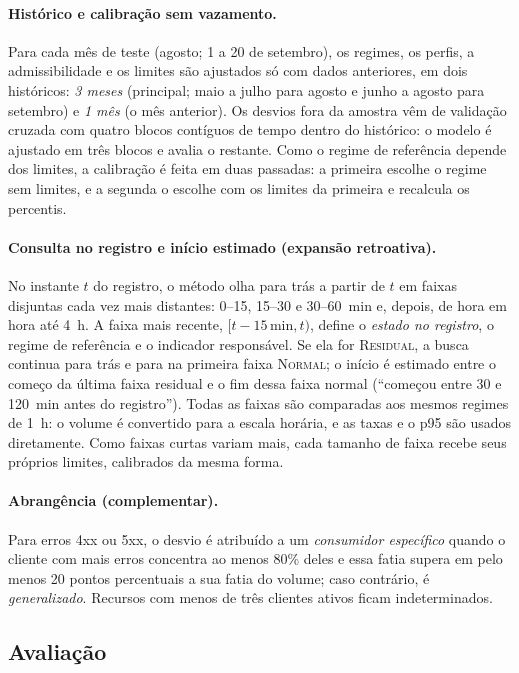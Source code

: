 \documentclass[sigconf,nonacm]{acmart}
\newcommand{\Normal}{\textsc{Normal}\xspace}
\newcommand{\Residual}{\textsc{Residual}\xspace}
\begin{document}
\paragraph{Histórico e calibração sem vazamento.} Para cada mês de teste (agosto; 1 a 20 de setembro), os regimes, os perfis, a admissibilidade e os limites são ajustados só com dados anteriores, em dois históricos: \emph{3 meses} (principal; maio a julho para agosto e junho a agosto para setembro) e \emph{1 mês} (o mês anterior). Os desvios fora da amostra vêm de validação cruzada com quatro blocos contíguos de tempo dentro do histórico: o modelo é ajustado em três blocos e avalia o restante. Como o regime de referência depende dos limites, a calibração é feita em duas passadas: a primeira escolhe o regime sem limites, e a segunda o escolhe com os limites da primeira e recalcula os percentis.

\paragraph{Consulta no registro e início estimado (expansão retroativa).} No instante $t$ do registro, o método olha para trás a partir de $t$ em faixas disjuntas cada vez mais distantes: 0--15, 15--30 e 30--60~min e, depois, de hora em hora até 4~h. A faixa mais recente, $[t-15\,\text{min}, t)$, define o \emph{estado no registro}, o regime de referência e o indicador responsável. Se ela for \Residual, a busca continua para trás e para na primeira faixa \Normal; o início é estimado entre o começo da última faixa residual e o fim dessa faixa normal (``começou entre 30 e 120~min antes do registro''). Todas as faixas são comparadas aos mesmos regimes de 1~h: o volume é convertido para a escala horária, e as taxas e o p95 são usados diretamente. Como faixas curtas variam mais, cada tamanho de faixa recebe seus próprios limites, calibrados da mesma forma.

\paragraph{Abrangência (complementar).} Para erros 4xx ou 5xx, o desvio é atribuído a um \emph{consumidor específico} quando o cliente com mais erros concentra ao menos 80\% deles e essa fatia supera em pelo menos 20 pontos percentuais a sua fatia do volume; caso contrário, é \emph{generalizado}. Recursos com menos de três clientes ativos ficam indeterminados.

\subsection{Avaliação}
\end{document}
